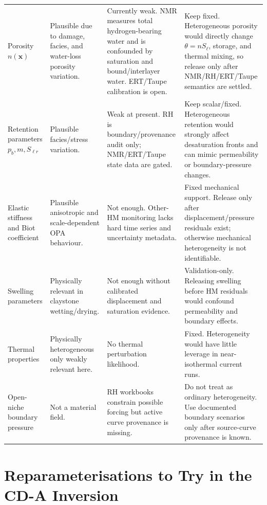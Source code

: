 \documentclass[10pt,a4paper]{article}
\newcommand{\npor}{n}
\newcommand{\Sat}{S_\ell}
\newcommand{\thetaw}{\theta}
\begin{document}
\begin{longtable}{@{}L{0.19\textwidth}L{0.18\textwidth}L{0.19\textwidth}Y@{}}
Porosity \(\npor(\bm x)\) & Plausible due to damage, facies, and water-loss porosity variation. & Currently weak.  NMR measures total hydrogen-bearing water and is confounded by saturation and bound/interlayer water. ERT/Taupe calibration is open. & Keep fixed.  Heterogeneous porosity would directly change \(\thetaw=\npor\Sat\), storage, and thermal mixing, so release only after NMR/RH/ERT/Taupe semantics are settled. \\
Retention parameters \(p_b,m,S_{\ell r}\) & Plausible facies/stress variation. & Weak at present.  RH is boundary/provenance audit only; NMR/ERT/Taupe state data are gated. & Keep scalar/fixed.  Heterogeneous retention would strongly affect desaturation fronts and can mimic permeability or boundary-pressure changes. \\
Elastic stiffness and Biot coefficient & Plausible anisotropic and scale-dependent OPA behaviour. & Not enough.  Other-HM monitoring lacks hard time series and uncertainty metadata. & Fixed mechanical support.  Release only after displacement/pressure residuals exist; otherwise mechanical heterogeneity is not identifiable. \\
Swelling parameters & Physically relevant in claystone wetting/drying. & Not enough without calibrated displacement and saturation evidence. & Validation-only.  Releasing swelling before HM residuals would confound permeability and boundary effects. \\
Thermal properties & Physically heterogeneous only weakly relevant here. & No thermal perturbation likelihood. & Fixed.  Heterogeneity would have little leverage in near-isothermal current runs. \\
Open-niche boundary pressure & Not a material field. & RH workbooks constrain possible forcing but active curve provenance is missing. & Do not treat as ordinary heterogeneity.  Use documented boundary scenarios only after source-curve provenance is known. \\
\end{longtable}

\section{Reparameterisations to Try in the CD-A Inversion}
\end{document}
